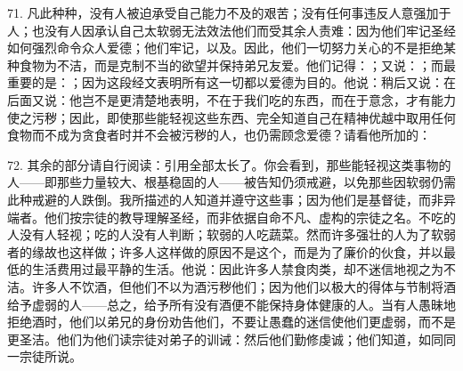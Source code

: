 71. 凡此种种，没有人被迫承受自己能力不及的艰苦；没有任何事违反人意强加于人；也没有人因承认自己太软弱无法效法他们而受其余人责难：因为他们牢记圣经如何强烈命令众人爱德；他们牢记，以及。因此，他们一切努力关心的不是拒绝某种食物为不洁，而是克制不当的欲望并保持弟兄友爱。他们记得：；又说：；而最重要的是：；因为这段经文表明所有这一切都以爱德为目的。他说：稍后又说：在后面又说：他岂不是更清楚地表明，不在于我们吃的东西，而在于意念，才有能力使之污秽；因此，即使那些能轻视这些东西、完全知道自己在精神优越中取用任何食物而不成为贪食者时并不会被污秽的人，也仍需顾念爱德？请看他所加的：\par

72. 其余的部分请自行阅读：引用全部太长了。你会看到，那些能轻视这类事物的人——即那些力量较大、根基稳固的人——被告知仍须戒避，以免那些因软弱仍需此种戒避的人跌倒。我所描述的人知道并遵守这些事；因为他们是基督徒，而非异端者。他们按宗徒的教导理解圣经，而非依据自命不凡、虚构的宗徒之名。不吃的人没有人轻视；吃的人没有人判断；软弱的人吃蔬菜。然而许多强壮的人为了软弱者的缘故也这样做；许多人这样做的原因不是这个，而是为了廉价的伙食，并以最低的生活费用过最平静的生活。他说：因此许多人禁食肉类，却不迷信地视之为不洁。许多人不饮酒，但他们不以为酒污秽他们；因为他们以极大的得体与节制将酒给予虚弱的人——总之，给予所有没有酒便不能保持身体健康的人。当有人愚昧地拒绝酒时，他们以弟兄的身份劝告他们，不要让愚蠢的迷信使他们更虚弱，而不是更圣洁。他们为他们读宗徒对弟子的训诫：然后他们勤修虔诚；他们知道，如同同一宗徒所说。\par

